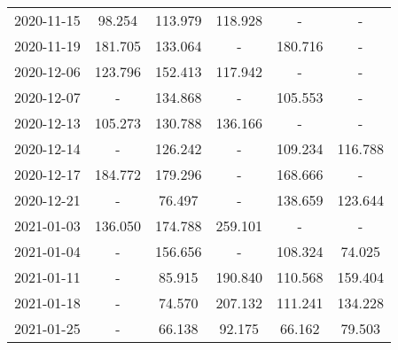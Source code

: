 \begin{table*}[t]
\begin{tabular}{cccccc}
2020-11-15 &   {\cellcolor{blue!25} 98.254} &                        113.979 &                        118.928 &                              - &                             - \\
2020-11-19 &                        181.705 &  {\cellcolor{blue!25} 133.064} &                              - &                        180.716 &                             - \\
2020-12-06 &                        123.796 &                        152.413 &  {\cellcolor{blue!25} 117.942} &                              - &                             - \\
2020-12-07 &                              - &                        134.868 &                              - &  {\cellcolor{blue!25} 105.553} &                             - \\
2020-12-13 &  {\cellcolor{blue!25} 105.273} &                        130.788 &                        136.166 &                              - &                             - \\
2020-12-14 &                              - &                        126.242 &                              - &  {\cellcolor{blue!25} 109.234} &                       116.788 \\
2020-12-17 &                        184.772 &                        179.296 &                              - &  {\cellcolor{blue!25} 168.666} &                             - \\
2020-12-21 &                              - &   {\cellcolor{blue!25} 76.497} &                              - &                        138.659 &                       123.644 \\
2021-01-03 &  {\cellcolor{blue!25} 136.050} &                        174.788 &                        259.101 &                              - &                             - \\
2021-01-04 &                              - &                        156.656 &                              - &                        108.324 &  {\cellcolor{blue!25} 74.025} \\
2021-01-11 &                              - &   {\cellcolor{blue!25} 85.915} &                        190.840 &                        110.568 &                       159.404 \\
2021-01-18 &                              - &   {\cellcolor{blue!25} 74.570} &                        207.132 &                        111.241 &                       134.228 \\
2021-01-25 &                              - &   {\cellcolor{blue!25} 66.138} &                         92.175 &                         66.162 &                        79.503 \\
\bottomrule
\end{tabular}

\end{table*}

